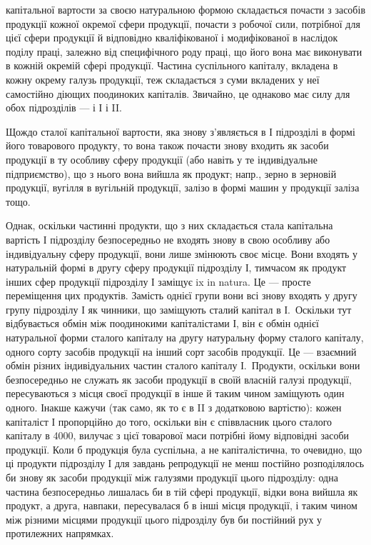 \parcont{}  %
капітальної вартости за своєю натуральною формою складається почасти
з засобів продукції кожної окремої сфери продукції, почасти з робочої
сили, потрібної для цієї сфери продукції й відповідно кваліфікованої і
модифікованої в наслідок поділу праці, залежно від специфічного роду
праці, що його вона має виконувати в кожній окремій сфері продукції.
Частина суспільного капіталу, вкладена в кожну окрему галузь продукції,
теж складається з суми вкладених у неї самостійно діющих поодиноких
капіталів. Звичайно, це однаково має силу для обох підрозділів —
і І і II.

Щождо сталої капітальної вартости, яка знову з’являється в І підрозділі
в формі його товарового продукту, то вона також почасти знову
входить як засоби продукції в ту особливу сферу продукції (або навіть у те
індивідуальне підприємство), що з нього вона вийшла як продукт; напр.,
зерно в зерновій продукції, вугілля в вугільній продукції, залізо в формі
машин у продукції заліза тощо.

Однак, оскільки частинні продукти, що з них складається стала капітальна
вартість І підрозділу безпосередньо не входять знову в свою
особливу або індивідуальну сферу продукції, вони лише змінюють своє
місце. Вони входять у натуральній формі в другу сферу продукції підрозділу
І, тимчасом як продукт інших сфер продукції підрозділу І заміщує
ix in natura. Це — просте переміщення цих продуктів. Замість однієї
групи вони всі знову входять у другу групу підрозділу І як чинники,
що заміщують сталий капітал в І.~Оскільки тут відбувається обмін між
поодинокими капіталістами І, він є обмін однієї натуральної форми сталого
капіталу на другу натуральну форму сталого капіталу, одного сорту засобів
продукції на інший сорт засобів продукції. Це — взаємний обмін
різних індивідуальних частин сталого капіталу І.~Продукти, оскільки вони
безпосередньо не служать як засоби продукції в своїй власній галузі продукції,
пересуваються з місця своєї продукції в інше й таким чином
заміщують один одного. Інакше кажучи (так само, як то є в II з додатковою
вартістю): кожен капіталіст І пропорційно до того, оскільки він є
співвласник цього сталого капіталу в 4000, вилучає з цієї товарової маси
потрібні йому відповідні засоби продукції. Коли б продукція була суспільна,
а не капіталістична, то очевидно, що ці продукти підрозділу І
для завдань репродукції не менш постійно розподілялось би знову як
засоби продукції між галузями продукції цього підрозділу: одна частина
безпосередньо лишалась би в тій сфері продукції, відки вона вийшла як
продукт, а друга, навпаки, пересувалася б в інші місця продукції, і таким
чином між різними місцями продукції цього підрозділу був би постійний
рух у протилежних напрямках.


